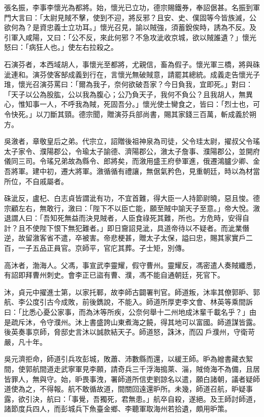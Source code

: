 \begin{pinyinscope}
 張名振，李事李懷光為都將。始，懷光已立功，德宗賜鐵券，奉詔倨甚。名振到軍門大言曰：「太尉見賊不擊，使到不迎，將反邪？且安、史、僕固等今皆族滅，公欲何為？是資忠義士立功耳。」懷光召見，諭以賊強，須蓄銳俟時，誘為不反。及引軍入咸陽，又曰：「公不反，來此何邪？不急攻泚收京城，欲以賊誰遺？」懷光怒曰：「病狂人也。」使左右拉殺之。



 石演芬者，本西域胡人，事懷光至都將，尤親信，畜為假子。懷光軍三橋，將與硃泚連和。演芬使客郜成義到行在，言懷光無破賊意，請罷其總統。成義走告懷光子琟，懷光召演芬罵曰：「爾為我子，奈何欲破吾家？今日負我，宜即死。」對曰：「天子以公為股肱，公以我為腹心；公乃負天子，我何不負公？且我胡人，無異心，惟知事一人，不呼我為賊，死固吾分。」懷光使士臠食之，皆曰：「烈士也，可令快死。」以刀斷其頸。德宗聞，贈演芬兵部尚書，賜其家錢三百萬，斬成義於朔方。



 吳漵者，章敬皇后之弟。代宗立，詔贈後祖神泉為司徒，父令珪太尉，擢叔父令瑤太子家令、濮陽郡公，令瑜太子諭德、濟陽郡公，漵太子詹事、濮陽郡公，並開府儀同三司。令瑤兄弟故為縣令、郎將矣，而漵用盛王府參軍進，俄遷鴻臚少卿、金吾將軍。建中初，遷大將軍。漵循循有禮讓，無倨氣矜色，見重朝廷，時以為材當所位，不自戚屬者。



 硃泚反，盧杞、白志貞皆謂泚有功，不宜首難，得大臣一人持節尉曉，惡且悛。德宗顧左右，無敢行，漵曰：「陛下不以臣亡能，願至賊中諭天子至意。」帝大悅。漵退謂人曰：「吾知死無益而決見賊者，人臣食祿死其難，所也。方危時，安得自計？且不使陛下恨下無犯難者。」即日齎詔見泚，具道帝待以不疑者。而泚業僭逆，故留漵客省不遣，卒被害。帝悲梗甚，贈太子太保，謚曰忠，賜其家實戶二百，一子五品正員官。京師平，官庀其葬。子士矩，別傳。



 高沐者，渤海人。父馮，事宣武李靈耀，假守曹州。靈耀反，馮密遣人奏賊纖悉，有詔即拜曹州刺史。會李正已盜有曹、濮，馮不能自通朝廷，死官下。



 沐，貞元中擢進士第，以家托鄆，故李師古闢署判官。師道叛，沐率其僚郭昈、郭航、李公度引古今成敗，前後鐫說，不能入。師道所厚吏李文會、林英等乘間訴曰：「比悉心憂公家事，而為沐等所疾，公奈何舉十二州地成沐輩千載名乎？」由是疏斥沐，令守濮州。沐上書盛誇山東煮海之饒，得其地可以富國。師道謀皆露。後英奏事京師，脅邸史言沐以誠款結天子。師道怒，誅沐，而囚戶濮州，守衛苛嚴，凡十年。



 吳元濟拒命，師道引兵攻彭城，敗蕭、沛數縣而還，以緩王師。昈為繒書藏衣絮間，使郭航間道走武寧軍見李願，請奇兵三千浮海搗萊、淄，賊倚海不為備，且居皆罪人，無與守。始，昈畏事洩，署師道所信吏劉諒名以遣，願白諸朝，議者疑師道使為之，不得報。航不敢循故道，間關回遠還昈所。未幾，師道召航，昈疑事露，欲引決，航曰：「事覺，吾獨死，君無患。」航卒自殺，遂絕。及王師討師道，諸節度兵四人，而彭城兵下魚臺金鄉、李聽軍取海州若拾遺，頗用昈策。




\end{pinyinscope}

